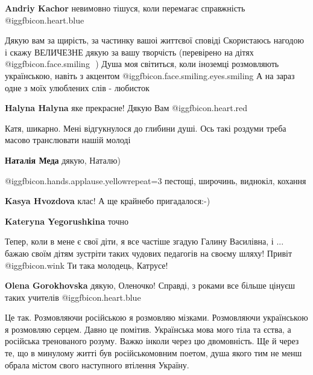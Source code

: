 \begin{itemize}
\begin{itemize} %
\textbf{Andriy Kachor} невимовно тішуся, коли перемагає справжність @igg{fbicon.heart.blue} 
\end{itemize} %


\obeycr
Дякую вам за щирість, за частинку вашоі життєвої сповіді
Скористаюсь нагодою і скажу ВЕЛИЧЕЗНЕ дякую за вашу творчість (перевірено на
дітях  @igg{fbicon.face.smiling} ️ )
Душа моя світиться, коли іноземці розмовляють українською, навіть з акцентом @igg{fbicon.face.smiling.eyes.smiling} 
А на зараз одне з моїх улюблених слів - любисток
\restorecr

\begin{itemize} %
\textbf{Halyna Halyna} яке прекрасне! Дякую Вам @igg{fbicon.heart.red}
\end{itemize} %

Катя, шикарно. Мені відгукнулося до глибини душі. Ось такі роздуми треба масово
транслювати нашій молоді

\begin{itemize} %
\textbf{Наталія Меда} дякую, Наталю)
\end{itemize} %

 @igg{fbicon.hands.applause.yellow}{repeat=3}  пестощі, широчинь, виднокіл, кохання

\begin{itemize} %
\textbf{Kasya Hvozdova} клас! А ще крайнебо пригадалося:-)

\textbf{Kateryna Yegorushkina} точно
\end{itemize} %

Тепер, коли в мене є свої діти, я все частіше згадую Галину Василівна, і ... бажаю своїм дітям зустріти таких чудових педагогів на своєму шляху!
Привіт @igg{fbicon.wink} Ти така молодець, Катрусе!

\begin{itemize} %
\textbf{Olena Gorokhovska} дякую, Оленочко! Справді, з роками все більше цінуєш таких учителів @igg{fbicon.heart.blue} 
\end{itemize} %


Це так. Розмовляючи російською я розмовляю мізками. Розмовляючи українською я
розмовляю серцем. Давно це помітив. Українська мова мого тіла та єства, а
російська тренованого розуму. Важко інколи через цю двомовність. Ще й через те,
що в минулому житті був російськомовним поетом, душа якого тим не менш обрала
містом свого наступного втілення Україну.



\end{itemize}
